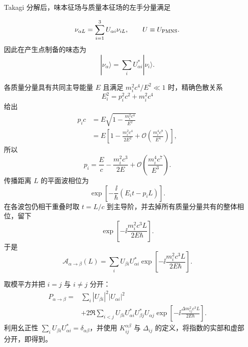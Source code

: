 \begin{derivation}
Takagi 分解后，味本征场与质量本征场的左手分量满足

\begin{equation*}
\nu_{\alpha L}=\sum_{i=1}^3U_{\alpha i}\nu_{iL},
\qquad U\equiv U_{\rm PMNS}.
\end{equation*}
因此在产生点制备的味态为
\begin{equation*}
|\nu_\alpha\rangle=\sum_iU_{\alpha i}^*|\nu_i\rangle.
\end{equation*}

各质量分量具有共同主导能量 $E$ 且满足 $m_i^2c^4/E^2\ll1$ 时，精确色散关系
\begin{equation*}
E_i^2=p_i^2c^2+m_i^2c^4
\end{equation*}
给出
\begin{align*}
p_ic
&=E\sqrt{1-\frac{m_i^2c^4}{E^2}}\\
&=E\left[1-\frac{m_i^2c^4}{2E^2}
+\mathcal O\!\left(\frac{m_i^4c^8}{E^4}\right)\right],
\end{align*}
所以
\begin{equation*}
p_i=\frac Ec-\frac{m_i^2c^3}{2E}
+\mathcal O\!\left(\frac{m_i^4c^7}{E^3}\right).
\end{equation*}
传播距离 $L$ 的平面波相位为
\begin{equation*}
\exp\!\left[-\frac{\ii}{\hbar}(E_it-p_iL)\right].
\end{equation*}
在各波包仍相干重叠时取 $t=L/c$ 到主导阶，并去掉所有质量分量共有的整体相位，留下
\begin{equation*}
\exp\!\left[-\ii\frac{m_i^2c^3L}{2E\hbar}\right].
\end{equation*}
于是
\begin{equation*}
\mathcal A_{\alpha\to\beta}(L)
=\sum_iU_{\beta i}U_{\alpha i}^*
\exp\!\left[-\ii\frac{m_i^2c^3L}{2E\hbar}\right].
\end{equation*}

取模平方并把 $i=j$ 与 $i\neq j$ 分开：
\begin{align*}
P_{\alpha\to\beta}
={}&\sum_i|U_{\beta i}|^2|U_{\alpha i}|^2\\
&+2\Re\sum_{i<j}
U_{\beta i}U_{\alpha i}^*U_{\beta j}^*U_{\alpha j}
\exp\!\left[-\ii\frac{\Delta m_{ij}^2c^3L}{2E\hbar}\right].
\end{align*}
利用幺正性 $\sum_iU_{\beta i}U_{\alpha i}^*=\delta_{\alpha\beta}$，并使用 $K_{ij}^{\alpha\beta}$ 与 $\Delta_{ij}$ 的定义，将指数的实部和虚部分开，即得到。

\end{derivation}

